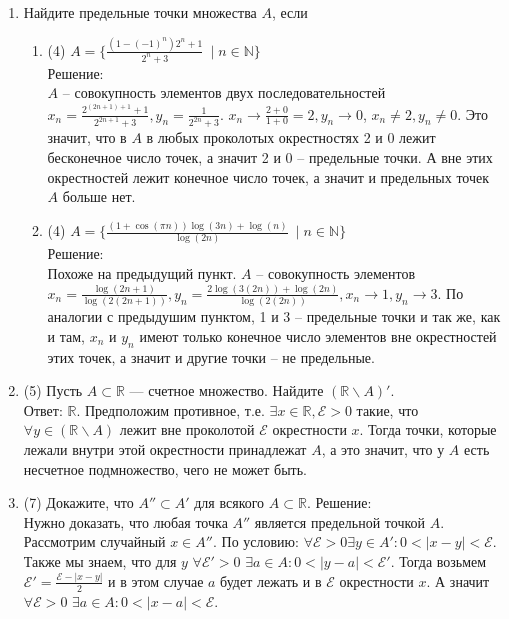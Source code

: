 \documentclass[a4paper]{article}
\begin{document}
\begin{enumerate}
	\item Найдите предельные точки множества $A$, если
	\begin{enumerate}
	    \item (4) $A = \{\frac{(1 - (-1)^n)2^n + 1}{2^n + 3}\ \mid n\in \mathbb N\}$\\
    Решение:\\
        $A$ -- совокупность элементов двух последовательностей $x_n = \frac{2^{(2n + 1)+1} + 1}{2^{2n+1} + 3}, y_n = \frac{1}{2^{2n} + 3}$. $x_n \rightarrow \frac{2 + 0}{1 + 0} = 2, y_n \rightarrow 0$, $x_n \neq 2, y_n \neq 0$. Это значит, что в $A$ в любых проколотых окрестностях 2 и 0 лежит бесконечное число точек, а значит 2 и 0 -- предельные точки. А вне этих окрестностей лежит конечное число точек, а значит и предельных точек $A$ больше нет.
        \item (4) $A = \{\frac{(1 + \cos (\pi n)) \log (3n) + \log(n)}{\log (2n)}\ \mid n\in \mathbb N\}$\\
    Решение:\\
    Похоже на предыдущий пункт. $A$ -- совокупность элементов $x_n = \frac{\log(2n+1)}{\log(2(2n+1))}, y_n = \frac{2\log(3(2n)) + \log(2n)}{\log(2(2n))}, x_n \rightarrow 1, y_n \rightarrow 3$. По аналогии с предыдушим пунктом, 1 и 3 -- предельные точки и так же, как и там, $x_n$ и $y_n$ имеют только конечное число элементов вне окрестностей этих точек, а значит и другие точки -- не предельные.
	\end{enumerate}
	
	\item (5) Пусть $A\subset \mathbb R$ --- счетное множество. Найдите $(\mathbb R\smallsetminus A)'$.\\
Ответ: $\mathbb R$. Предположим противное, т.е. $\exists x \in \mathbb R, \mathcal{E} > 0$ такие, что $\forall y \in (\mathbb R\smallsetminus A)$ лежит вне проколотой $\mathcal{E}$ окрестности $x$. Тогда точки, которые лежали внутри этой окрестности принадлежат $A$, а это значит, что у $A$ есть несчетное подмножество, чего не может быть. 
	\item (7) Докажите, что $A''\subset A'$ для всякого $A\subset \mathbb R$.
    Решение:\\ 
    Нужно доказать, что любая точка $A''$ является предельной точкой $A$. Рассмотрим случайный $x \in A''$. По условию: $\forall \mathcal{E} > 0 \exists y \in A': 0 < |x - y| < \mathcal{E}$. Также мы знаем, что для $y$ $\forall \mathcal{E'} > 0$ $\exists a \in A: 0 < |y - a|<\mathcal{E'}$. Тогда возьмем $\mathcal{E'} = \frac{\mathcal{E} - |x-y|}{2}$ и в этом случае $a$ будет лежать и в $\mathcal{E}$ окрестности $x$. А значит $\forall \mathcal{E} > 0$ $\exists a \in A : 0 < |x-a| < \mathcal{E}$.
\end{enumerate}
\end{document}
